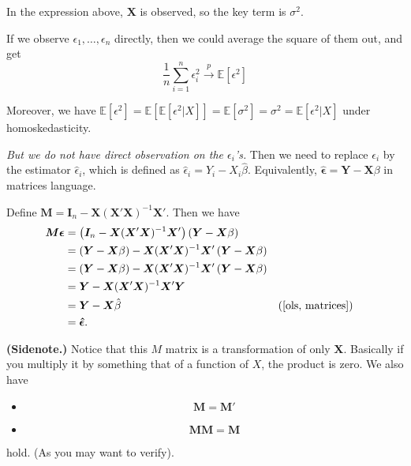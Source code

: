 \documentclass[11pt,a4paper]{amsart}
\theoremstyle{plain}
\theoremstyle{definition}
\begin{document}
	In the expression above, $\bm{X}$ is observed, so the key term is $\sigma^{2}$. \par 
	If we observe $\epsilon_{1}, \dots, \epsilon_{n}$ directly, then we could average the square of them out, and get
	\[	\frac{1}{n}\sum_{i=1}^{n} \epsilon_{i}^{2} \stackrel{p}{\longrightarrow} \mathbb{E}[\epsilon^{2}]	\]
	
	Moreover, we have $\mathbb{E}[\epsilon^{2}] = \mathbb{E}[\mathbb{E}[\epsilon^{2}|X]] = \mathbb{E}[\sigma^{2}] = \sigma^{2} = \mathbb{E}[\epsilon^{2}|X]$ under homoskedasticity.\par 
	\emph{But we do not have direct observation on the $\epsilon_{i}$'s.} Then we need to replace $\epsilon_{i}$ by the estimator $\hat{\epsilon}_{i}$, which is defined as $\hat{\epsilon}_{i} = Y_{i} - X_{i}\hat{\beta}$. Equivalently, $\bm{\hat{\epsilon}} = \bm{Y} - \bm{X} \beta$ in matrices language. \par 
	Define $\bm{M} = \bm{I}_{n} - \bm{X}(\bm{X}'\bm{X})^{-1}\bm{X}'$. Then we have 
	\[	\begin{aligned}
		\bm{M}\bm{\epsilon} &= \left(  \bm{I}_{n} - \bm{X}(\bm{X}'\bm{X})^{-1}\bm{X}' \right) \left(\bm{Y} - \bm{X}\beta \right)  \\
		&= \left(\bm{Y} - \bm{X}\beta \right) - \bm{X}(\bm{X}'\bm{X})^{-1}\bm{X}'\left(\bm{Y} - \bm{X}\beta \right) \\
		&= \left(\bm{Y} - \bm{X}\beta \right) - \bm{X}(\bm{X}'\bm{X})^{-1}\bm{X}'\left(\bm{Y} - \bm{X}\beta \right)\\
		&=  \bm{Y} - \bm{X}(\bm{X}'\bm{X})^{-1}\bm{X}'\bm{Y} \\
		&=  \bm{Y} - \bm{X}\hat{\beta} &&\text{(\ref{ols, matrices})} \\
		&= \bm{\hat{\epsilon}}.
	\end{aligned}  	\]
	
	\begin{framed}
		 \textbf{(Sidenote.)} Notice that this $M$ matrix is a transformation of only $\bm{X}$. Basically if you multiply it by something that of a function of $X$, the product is zero. We also have 
		 \begin{itemize}
		 	\item
		 	\[	 \bm{M} =  \bm{M}'	\]
		 	\item
		 	\[	 \bm{M} \bm{M} = \bm{M}	\]
		 \end{itemize}
	 hold. (As you may want to verify).
	\end{framed}
\end{document}

